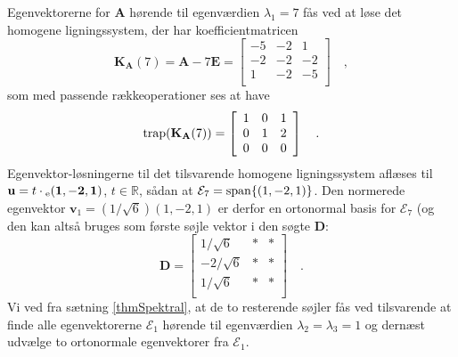 \begin{example}
Egenvektorerne for $\mathbf{A}$ hørende til egenværdien $\lambda_{1} = 7$ fås ved at løse det homogene ligningssystem, der har koefficientmatricen
\begin{equation}
\mathbf{K}_{\mathbf{A}}(7) = \mathbf{A} - 7\mathbf{E} = \left[
                                          \begin{array}{rrr}
                                            -5 &  -2 & 1 \\
                                            -2 & -2 & -2 \\
                                            1 & -2& -5 \\
                                          \end{array}
                                        \right] \quad ,
\end{equation}
som med passende rækkeoperationer ses at have
\begin{equation}
\mathrm{trap}(\mathbf{K}_{\mathbf{A}}(7)) = \left[
                                          \begin{array}{rrr}
                                            1 &  0 & 1 \\
                                            0 & 1 & 2 \\
                                            0 & 0& 0 \\
                                          \end{array}
                                        \right] \quad .
\end{equation}
Egenvektor-løsningerne til det tilsvarende homogene ligningssystem aflæses til $\mathbf{u} = t\cdot{_\mathrm{e}\mathbf{(1, -2, 1)}}$, $t \in \mathbb{R}$, sådan at $\mathcal{E}_{7}= \mathrm{span}\{(1,-2,1)\}$. Den normerede egenvektor $\mathbf{v}_{1} = (1/\sqrt{6})(1, -2, 1)$ er derfor en ortonormal basis for $\mathcal{E}_{7}$ (og den kan altså bruges som første søjle vektor i den søgte $\mathbf{D}$:
\begin{equation}
\mathbf{D}= \left[
          \begin{array}{rrr}
            1/\sqrt{6} & * & * \\
            -2/\sqrt{6} & * & * \\
            1/\sqrt{6} & * & * \\
          \end{array}
        \right] \quad .
\end{equation}
Vi ved fra sætning \ref{thmSpektral}, at de to resterende søjler fås ved tilsvarende at finde alle egenvektorerne $\mathcal{E}_{1}$  hørende til egenværdien $\lambda_{2} = \lambda_{3} = 1$ og dernæst udvælge to ortonormale egenvektorer fra $\mathcal{E}_{1}$. \\


\end{example}
